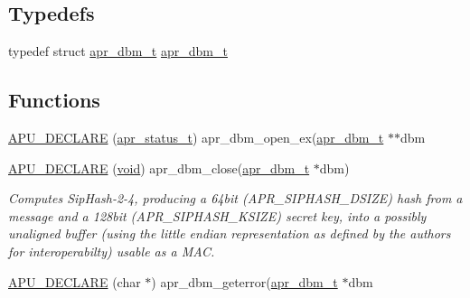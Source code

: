 \subsection*{Typedefs}
\begin{DoxyCompactItemize}
\item 
typedef struct \hyperlink{structapr__dbm__t}{apr\+\_\+dbm\+\_\+t} \hyperlink{group__APR__Util__DBM_ga47f6ff771143ed7b7987c686c20c8536}{apr\+\_\+dbm\+\_\+t}
\end{DoxyCompactItemize}
\subsection*{Functions}
\begin{DoxyCompactItemize}
\item 
\hyperlink{group__APR__Util__DBM_gac36b022b8ba06c1d966762b73972c090}{A\+P\+U\+\_\+\+D\+E\+C\+L\+A\+RE} (\hyperlink{group__apr__errno_gaa5105fa83cc322f09382292db8b47593}{apr\+\_\+status\+\_\+t}) apr\+\_\+dbm\+\_\+open\+\_\+ex(\hyperlink{structapr__dbm__t}{apr\+\_\+dbm\+\_\+t} $\ast$$\ast$dbm
\item 
\hyperlink{group__APR__Util__DBM_gabd2528499ce66c68dc05d60927725a39}{A\+P\+U\+\_\+\+D\+E\+C\+L\+A\+RE} (\hyperlink{group__MOD__ISAPI_gacd6cdbf73df3d9eed42fa493d9b621a6}{void}) apr\+\_\+dbm\+\_\+close(\hyperlink{structapr__dbm__t}{apr\+\_\+dbm\+\_\+t} $\ast$dbm)
\begin{DoxyCompactList}\small\item\em Computes Sip\+Hash-\/2-\/4, producing a 64bit (A\+P\+R\+\_\+\+S\+I\+P\+H\+A\+S\+H\+\_\+\+D\+S\+I\+ZE) hash from a message and a 128bit (A\+P\+R\+\_\+\+S\+I\+P\+H\+A\+S\+H\+\_\+\+K\+S\+I\+ZE) secret key, into a possibly unaligned buffer (using the little endian representation as defined by the authors for interoperabilty) usable as a M\+AC. \end{DoxyCompactList}\item 
\hyperlink{group__APR__Util__DBM_gae463ab34ff3f518da3d799f0e264e20d}{A\+P\+U\+\_\+\+D\+E\+C\+L\+A\+RE} (char $\ast$) apr\+\_\+dbm\+\_\+geterror(\hyperlink{structapr__dbm__t}{apr\+\_\+dbm\+\_\+t} $\ast$dbm
\end{DoxyCompactItemize}

